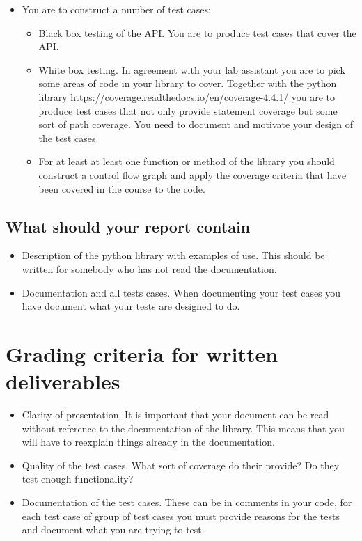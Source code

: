 \documentclass[a4page]{article}
\begin{document}
\begin{itemize}

    \item You are to construct a number of test cases:
    \begin{itemize}
    \item  Black box testing of the API. You are to produce test cases
      that cover the API.
    \item  White box testing. In agreement with your lab assistant you
      are to pick some areas of code in your library to cover. Together with
      the python library
      \url{https://coverage.readthedocs.io/en/coverage-4.4.1/} you are
      to produce test cases that not only provide statement coverage
      but some sort of path coverage. You need to document and
      motivate your design of the test cases. 
    \item For at least at least one function or method of the library you
      should construct a control flow graph and apply the coverage criteria
      that have been covered in the course to the code.

    \end{itemize}
  \end{itemize}




  \subsection*{What should your report contain}
  \begin{itemize}
  \item Description of the python library with examples of use. This should be
    written for somebody who has not read the documentation.
  \item Documentation and all tests cases.  When documenting your test cases
    you have document what your tests are designed to do.
  \end{itemize}
\section{Grading criteria for written deliverables}
\begin{itemize}
\item Clarity of presentation. It is important that your document can
  be read without reference to the documentation of the library. This
  means that you will have to reexplain things already in the
  documentation. 
\item Quality of the test cases. What sort of coverage do their
  provide? Do they test enough functionality?
\item Documentation of the test cases. These can be in comments in
  your code, for each test case of group of test cases you must
  provide reasons for the tests and document  what you are trying to
  test.
 
\end{itemize}
\end{document}
